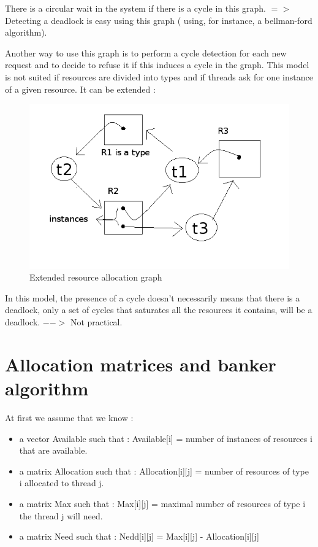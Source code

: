 \documentclass[a4paper,10pt]{article}
\begin{document}
There is a circular wait in the system if there is a cycle in this graph.
$=>$ Detecting a deadlock is easy using this graph ( using, for instance, a bellman-ford algorithm).

Another way to use this graph is to perform a cycle detection for each new request and to decide to refuse it if this induces a cycle in the graph.
This model is not suited if resources are divided into types and if threads ask for one instance of a given resource.
It can be extended :

\begin{figure}[h]
  \begin{center}
    \includegraphics[scale=0.6]{resource_graph_extended}
    \caption{Extended resource allocation graph}
  \end{center}
\end{figure}

In this model, the presence of a cycle doesn't necessarily means that there is a deadlock, only a set of cycles that saturates all the resources it contains, will be a deadlock. $-->$ Not practical.

\section{Allocation matrices and banker algorithm}

At first we assume that we know :

\begin{itemize}
  \item a vector Available such that : Available[i] = number of instances of resources i that are available.
  \item a matrix Allocation such that : Allocation[i][j] = number of resources of type i allocated to thread j.
  \item a matrix Max such that : Max[i][j] = maximal number of resources of type i the thread j will need.
  \item a matrix Need such that : Nedd[i][j] = Max[i][j] - Allocation[i][j]
\end{itemize}
\end{document}
